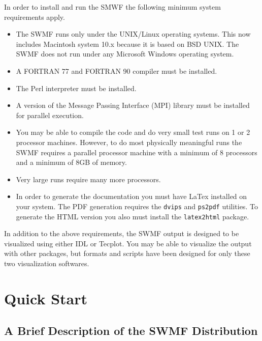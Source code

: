 In order to install and run the SMWF the following minimum system
requirements apply.

\begin{itemize}
\item The SWMF runs only under the UNIX/Linux operating systems.  This now
  includes Macintosh system 10.x because it is based on BSD UNIX.  The
  SWMF does not run under any Microsoft Windows operating system.
\item A FORTRAN 77 and FORTRAN 90 compiler must be installed.
\item The Perl interpreter must be installed.
\item A version of the Message Passing Interface (MPI) library must be
  installed for parallel execution.
\item You may be able to compile the code and do very small test
runs on 1 or 2 processor machines.  However, to do most physically
meaningful runs the SWMF requires a parallel processor machine with a 
minimum of 8 processors and a minimum of 8GB of memory.
\item Very large runs require many more processors.
\item In order to generate the documentation you must have LaTex installed on
your system.  The PDF generation requires the {\tt dvips} and {\tt ps2pdf}
utilities.  To generate the HTML version you also must install the
{\tt latex2html} package. 

\end{itemize}

In addition to the above requirements, the SWMF output is designed to
be visualized using either IDL or Tecplot.  You may be able to
visualize the output with other packages, but formats and scripts have
been designed for only these two visualization softwares.





\chapter{Quick Start}

\section{A Brief Description of the SWMF Distribution}

